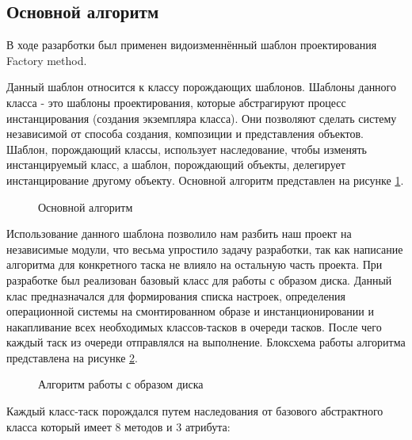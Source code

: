 \subsection{Основной алгоритм}
В ходе разарботки был применен видоизменнённый шаблон проектирования Factory method.

Данный шаблон относится к классу порождающих шаблонов. Шаблоны данного класса - это шаблоны проектирования, которые абстрагируют процесс инстанцирования (создания экземпляра класса). Они позволяют сделать систему независимой от способа создания, композиции и представления объектов. Шаблон, порождающий классы, использует наследование, чтобы изменять инстанцируемый класс, а шаблон, порождающий объекты, делегирует инстанцирование другому объекту.
Основной алгоритм представлен на рисунке \ref{architech:architech}.

\begin{figure}[h!]
\caption{Основной алгоритм}
\label{architech:architech}
\end{figure}

Использование данного шаблона позволило нам разбить наш проект на независимые модули, что весьма упростило задачу разработки, так как написание алгоритма для конкретного таска не влияло на остальную часть проекта. При разработке был реализован базовый класс для работы с образом диска. Данный клас предназначался для формирования списка настроек, определения операционной системы на смонтированном образе и инстанционировании и накапливание всех необходимых классов-тасков в очереди тасков. После чего каждый таск из очереди отправлялся на выполнение. Блоксхема работы алгоритма представлена на рисунке \ref{alg_main:alg_main}.

\begin{figure}[h!]
\caption{Алгоритм работы с образом диска}
\label{alg_main:alg_main}
\end{figure}

Каждый класс-таск порождался путем наследования от базового абстрактного класса который имеет 8 методов и 3 атрибута:

